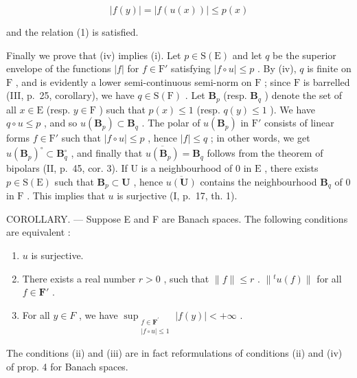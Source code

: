 \[
\left| f (y) \right| = \left| f (u (x)) \right| \leqslant p (x)
\]

and the relation (1) is satisfied.

Finally we prove that (iv) implies (i). Let \(p \in \mathrm{S}(\mathrm{E})\) and let \(q\) be the superior envelope of the functions \(|f|\) for \(f \in \mathrm{F}'\) satisfying \(|f \circ u| \leqslant p\) . By (iv), \(q\) is finite on \(\mathrm{F}\) , and is evidently a lower semi-continuous semi-norm on \(\mathrm{F}\) ; since \(\mathrm{F}\) is barrelled (III, p.~25, corollary), we have \(q \in \mathrm{S}(\mathrm{F})\) . Let \(\mathbf{B}_p\) (resp. \(\mathbf{B}_q\) ) denote the set of all \(x \in \mathrm{E}\) (resp. \(y \in \mathrm{F}\) ) such that \(p(x) \leqslant 1\) (resp. \(q(y) \leqslant 1\) ). We have \(q \circ u \leqslant p\) , and so \(u(\mathbf{B}_p) \subset \mathbf{B}_q\) . The polar of \(u(\mathbf{B}_p)\) in \(\mathrm{F}'\) consists of linear forms \(f \in \mathrm{F}'\) such that \(|f \circ u| \leqslant p\) , hence \(|f| \leqslant q\) ; in other words, we get \(u(\mathbf{B}_p)^{\circ} \subset \mathbf{B}_q^{\circ}\) , and finally that \(\overline{u(\mathbf{B}_p)} = \mathbf{B}_q\) follows from the theorem of bipolars (II, p.~45, cor. 3). If \(\mathrm{U}\) is a neighbourhood of 0 in \(\mathrm{E}\) , there exists \(p \in \mathrm{S}(\mathrm{E})\) such that \(\mathbf{B}_p \subset \mathbf{U}\) , hence \(\overline{u(\mathbf{U})}\) contains the neighbourhood \(\mathbf{B}_q\) of 0 in \(\mathrm{F}\) . This implies that \(u\) is surjective (I, p.~17, th. 1).

COROLLARY. --- Suppose E and F are Banach spaces. The following conditions are equivalent :

\begin{enumerate}
\def\labelenumi{(\roman{enumi})}
\item
  \(u\) is surjective.
\item
  There exists a real number \(r > 0\) , such that \(\| f \| \leqslant r\) . \(\| {}^t u(f) \|\) for all \(f \in \mathbf{F}'\) .
\item
  For all \(y \in F\) , we have \(\sup_{\substack{f\in \mathbf{F}^{\prime}\\ |f\circ u|\leqslant 1}} |f(y)| < +\infty\) .
\end{enumerate}

The conditions (ii) and (iii) are in fact reformulations of conditions (ii) and (iv) of prop. 4 for Banach spaces.

